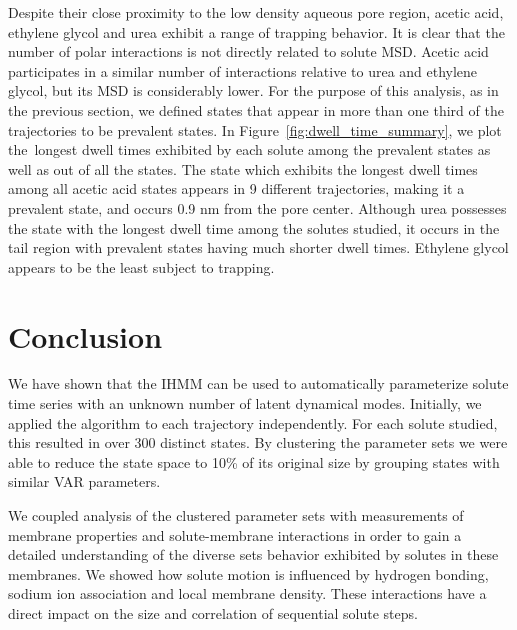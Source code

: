 \documentclass[journal=jpcbfk,manuscript=article]{achemso}
\begin{document}
  Despite their close proximity to the low density aqueous pore region, acetic
  acid, ethylene glycol and urea exhibit a range of trapping behavior.
  It is clear that the number of polar interactions is not directly
  related to solute MSD. Acetic acid participates in a similar number of 
  interactions relative to urea and ethylene glycol, but its MSD is considerably
  lower. For the purpose of this analysis, as in the previous section, we 
  defined states that appear in more than one third of the trajectories to
  be prevalent states. In Figure~\ref{fig:dwell_time_summary}, we plot the\
  longest dwell times exhibited by each solute among the prevalent states as 
  well as out of all the states. The state which exhibits the longest dwell
  times among all acetic acid states appears in 9 different trajectories, 
  making it a prevalent state, and occurs 0.9 nm from the pore center.
  Although urea possesses the state with the longest dwell time among the
  solutes studied, it occurs in the tail region with prevalent states having 
  much shorter dwell times. Ethylene glycol appears to be the least subject to
  trapping.

  
  \section{Conclusion}
  
  We have shown that the IHMM can be used to automatically parameterize solute 
  time series with an unknown number of latent dynamical modes. Initially, we applied
  the algorithm to each trajectory independently. For each solute studied, this resulted
  in over 300 distinct states. By clustering the parameter sets we were able to reduce 
  the state space to 10\% of its original size by grouping states with similar VAR
  parameters.
  
  We coupled analysis of the clustered parameter sets with measurements of membrane 
  properties and solute-membrane interactions in order to gain a detailed understanding
  of the diverse sets behavior exhibited by solutes in these membranes. We showed how
  solute motion is influenced by hydrogen bonding, sodium ion association and local
  membrane density. These interactions have a direct impact on the size and
  correlation of sequential solute steps.
  
\end{document}
